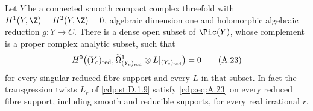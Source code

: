 \begin{proposition}\label{cdp:st:A.4.9}

Let $Y$ be a connected smooth compact complex threefold with $H^1(Y,\Z)=H^2(Y,\Z)=0$, algebraic dimension one and holomorphic algebraic reduction $g:Y\to C$. There is a dense open subset of $\Pic(Y)$, whose complement is a proper complex analytic subset, such that
\[
 H^0\bigl((Y_c)_{\rm red},
       \widetilde\Omega^1_{(Y_c)_{\rm red}}\otimes L|_{(Y_c)_{\rm red}}\bigr)=0
 \tag{A.23}\label{cdp:eq:A.23}
\]
for every singular reduced fibre support and every $L$ in that subset. In fact the transgression twists $L_r$ of \ref{cdp:st:D.1.9} satisfy \eqref{cdp:eq:A.23} on every reduced fibre support, including smooth and reducible supports, for every real irrational $r$.
\end{proposition}

